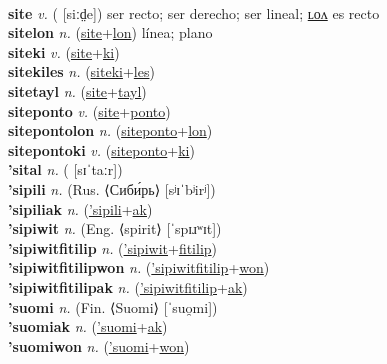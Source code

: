  \label{'sikfitilip} \\
\textbf{site} \textit{v.} ( [siːd̤e])
ser recto; ser derecho; ser lineal; \hyperref[sitelon]{ʟᴏᴧ} es recto \label{site} \\
\textbf{sitelon} \textit{n.} (\hyperref[site]{site}+\hyperref[lon]{lon})
línea; plano \label{sitelon} \\
\textbf{siteki} \textit{v.} (\hyperref[site]{site}+\hyperref[ki]{ki})
 \label{siteki} \\
\textbf{sitekiles} \textit{n.} (\hyperref[siteki]{siteki}+\hyperref[les]{les})
 \label{sitekiles} \\
\textbf{sitetayl} \textit{n.} (\hyperref[site]{site}+\hyperref[tayl]{tayl})
 \label{sitetayl} \\
\textbf{siteponto} \textit{v.} (\hyperref[site]{site}+\hyperref[ponto]{ponto})
 \label{siteponto} \\
\textbf{sitepontolon} \textit{n.} (\hyperref[siteponto]{siteponto}+\hyperref[lon]{lon})
 \label{sitepontolon} \\
\textbf{sitepontoki} \textit{v.} (\hyperref[siteponto]{siteponto}+\hyperref[ki]{ki})
 \label{sitepontoki} \\
\textbf{'sital} \textit{n.} ( [sɪˈtaːr])
 \label{'sital} \\
\textbf{'sipili} \textit{n.} (Rus. ⟨Сиби́рь⟩ [sʲɪˈbʲirʲ])
 \label{'sipili} \\
\textbf{'sipiliak} \textit{n.} (\hyperref['sipili]{'sipili}+\hyperref[ak]{ak})
 \label{'sipiliak} \\
\textbf{'sipiwit} \textit{n.} (Eng. ⟨spirit⟩ [ˈspɪɹʷɪt])
 \label{'sipiwit} \\
\textbf{'sipiwitfitilip} \textit{n.} (\hyperref['sipiwit]{'sipiwit}+\hyperref[fitilip]{fitilip})
 \label{'sipiwitfitilip} \\
\textbf{'sipiwitfitilipwon} \textit{n.} (\hyperref['sipiwitfitilip]{'sipiwitfitilip}+\hyperref[won]{won})
 \label{'sipiwitfitilipwon} \\
\textbf{'sipiwitfitilipak} \textit{n.} (\hyperref['sipiwitfitilip]{'sipiwitfitilip}+\hyperref[ak]{ak})
 \label{'sipiwitfitilipak} \\
\textbf{'suomi} \textit{n.} (Fin. ⟨Suomi⟩ [ˈsuo̯mi])
 \label{'suomi} \\
\textbf{'suomiak} \textit{n.} (\hyperref['suomi]{'suomi}+\hyperref[ak]{ak})
 \label{'suomiak} \\
\textbf{'suomiwon} \textit{n.} (\hyperref['suomi]{'suomi}+\hyperref[won]{won})
 \label{'suomiwon} \\
